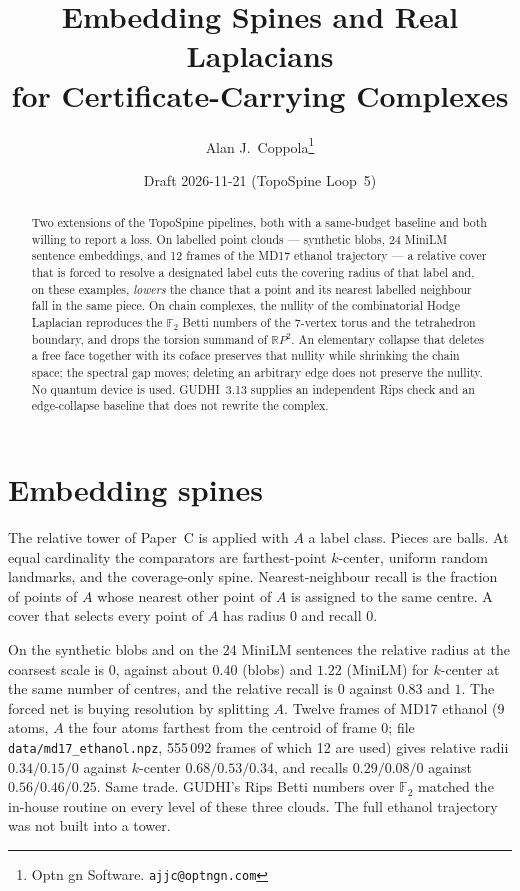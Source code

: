 \documentclass[11pt]{article}
\title{Embedding Spines and Real Laplacians\\
for Certificate-Carrying Complexes}
\author{Alan J.\ Coppola\thanks{Optn gn Software. \texttt{ajjc@optngn.com}}}
\date{Draft 2026-11-21 (TopoSpine Loop~5)}
\begin{document}
\maketitle

\begin{abstract}
Two extensions of the TopoSpine pipelines, both with a same-budget baseline and
both willing to report a loss.  On labelled point clouds --- synthetic blobs,
24 MiniLM sentence embeddings, and 12 frames of the MD17 ethanol trajectory ---
a relative cover that is forced to resolve a designated label cuts the
covering radius of that label and, on these examples, \emph{lowers} the chance
that a point and its nearest labelled neighbour fall in the same piece.
On chain complexes, the nullity of the combinatorial Hodge Laplacian reproduces
the $\mathbb F_2$ Betti numbers of the 7-vertex torus and the tetrahedron
boundary, and drops the torsion summand of $\mathbb{R}P^2$.  An elementary
collapse that deletes a free face together with its coface preserves that
nullity while shrinking the chain space; the spectral gap moves; deleting an
arbitrary edge does not preserve the nullity.  No quantum device is used.
GUDHI~3.13 supplies an independent Rips check and an edge-collapse baseline
that does not rewrite the complex.
\end{abstract}

\section{Embedding spines}
The relative tower of Paper~C is applied with $A$ a label class.  Pieces are
balls.  At equal cardinality the comparators are farthest-point $k$-center,
uniform random landmarks, and the coverage-only spine.  Nearest-neighbour
recall is the fraction of points of $A$ whose nearest other point of $A$ is
assigned to the same centre.  A cover that selects every point of $A$ has
radius 0 and recall 0.



On the synthetic blobs and on the 24 MiniLM sentences the relative radius at
the coarsest scale is 0, against about $0.40$ (blobs) and $1.22$ (MiniLM) for
$k$-center at the same number of centres, and the relative recall is 0 against
$0.83$ and $1$.  The forced net is buying resolution by splitting $A$.
Twelve frames of MD17 ethanol (9 atoms, $A$ the four atoms farthest from the
centroid of frame 0; file \texttt{data/md17\_ethanol.npz}, 555\,092 frames of
which 12 are used) gives relative radii $0.34/0.15/0$ against $k$-center
$0.68/0.53/0.34$, and recalls $0.29/0.08/0$ against $0.56/0.46/0.25$.
Same trade.  GUDHI's Rips Betti numbers over $\mathbb F_2$ matched the
in-house routine on every level of these three clouds.  The full ethanol
trajectory was not built into a tower.
\end{document}
